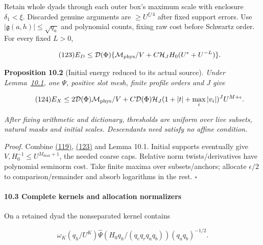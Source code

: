 Retain whole dyads through each outer box's maximum scale with enclosure \(\delta_1<\xi\). Discarded genuine arguments are \(\ge U^{\xi/4}\) after fixed support errors. Use \(|\mathfrak g(a,h)|\le\sqrt{q_a}\) and polynomial counts, fixing raw cost before Schwartz order. For every fixed \(L>0\),

\hypertarget{sr:first-remainder}{}

\label{sr:first-remainder}

\[
\qquad\text{(123)}
 E_D\le\mathcal D(\Phi)\{\mathcal M_{\rm phys}/V+
 C\mathcal H_JH_0(U^\epsilon+U^{-L})\}.
\]

\textbf{Proposition 10.2} (Initial energy reduced to its actual source). \emph{\hypertarget{sr:initial-reduction}{}\label{sr:initial-reduction} Under Lemma~\protect\hyperlink{sr:comparison-bound}{10.1}, one \(\Psi\), positive slot mesh, finite profile orders and \(J\) give \hypertarget{sr:initial-inequality}{}\label{sr:initial-inequality}}

\[
\qquad\text{(124)}
 E_X\le2\mathcal D(\Phi)\mathcal M_{\rm phys}/V+
 C\mathcal D(\Phi)\mathcal H_J(1+|t|+\max_i|v_i|)^J U^{M+\epsilon}.
\]

\emph{After fixing arithmetic and dictionary, thresholds are uniform over live subsets, natural masks and initial scales. Descendants need satisfy no affine condition.}

\emph{Proof.} Combine \protect\hyperlink{sr:positive-comparison}{(119)}, \protect\hyperlink{sr:first-remainder}{(123)} and Lemma 10.1. Initial supports eventually give \(V,H_0^{-1}\le U^{M_{\max}+1}\), the needed coarse caps. Relative norm twists/derivatives have polynomial seminorm cost. Take finite maxima over subsets/anchors; allocate \(\epsilon/2\) to comparison/remainder and absorb logarithms in the rest. \(\square\)

\hypertarget{sr:kernel-budget}{}

\label{sr:kernel-budget}

\hypertarget{complete-kernels-and-allocation-normalizers}{%
\paragraph{10.3 Complete kernels and allocation normalizers}\label{complete-kernels-and-allocation-normalizers}}

On a retained dyad the nonseparated kernel contains

\[
\omega_K(q_h/U^K)\widehat\Psi(H_0q_h/(q_eq_rq_aq_b))
                  (q_aq_b)^{-1/2}.
\]

